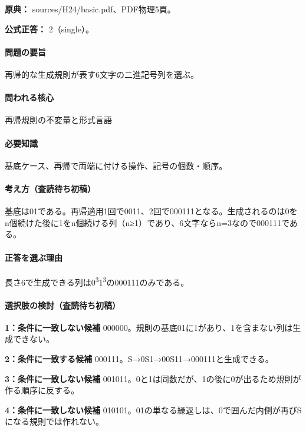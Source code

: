 \noindent\textbf{原典：} sources/H24/basic.pdf、PDF物理5頁。

\textbf{公式正答：} 2（single）。

\paragraph{問題の要旨} 再帰的な生成規則が表す6文字の二進記号列を選ぶ。

\paragraph{問われる核心} 再帰規則の不変量と形式言語

\paragraph{必要知識} 基底ケース、再帰で両端に付ける操作、記号の個数・順序。

\paragraph{考え方（査読待ち初稿）} 基底は01である。再帰適用1回で0011、2回で000111となる。生成されるのは0をn個続けた後に1をn個続ける列（n≥1）であり、6文字ならn=\allowbreak{}3なので000111である。

\paragraph{正答を選ぶ理由} 長さ6で生成できる列は0\textsuperscript{3}1\textsuperscript{3}の000111のみである。

\paragraph{選択肢の検討（査読待ち初稿）}\mbox{}\par

\noindent\textbf{1：条件に一致しない候補} 000000。規則の基底01に1があり、1を含まない列は生成できない。\par

\noindent\textbf{2：条件に一致する候補} 000111。S→0S1→00S11→000111と生成できる。\par

\noindent\textbf{3：条件に一致しない候補} 001011。0と1は同数だが、1の後に0が出るため規則が作る順序に反する。\par

\noindent\textbf{4：条件に一致しない候補} 010101。01の単なる繰返しは、0で囲んだ内側が再びSになる規則では作れない。\par

